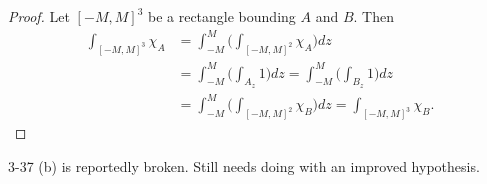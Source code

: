 \documentclass[20pt]{article}
\theoremstyle{plain}
\theoremstyle{definition}
\begin{document}
\begin{proof}
  Let $[-M, M]^3$ be a rectangle bounding $A$ and $B$. Then
  \begin{align*}
    \int_{[-M, M]^3}\chi_A
    &= \int_{-M}^M \bigg( \int_{[-M, M]^2} \chi_A \bigg)dz \\
    &= \int_{-M}^M \bigg( \int_{A_z} 1 \bigg) dz
    = \int_{-M}^M \bigg( \int_{B_z} 1 \bigg) dz \\
    &= \int_{-M}^M \bigg( \int_{[-M, M]^2} \chi_B \bigg)dz
    = \int_{[-M, M]^3}\chi_B.
  \end{align*}
\end{proof}


\color{Blue}
3-37 (b) is reportedly broken. Still needs doing with an improved hypothesis.
\color{Black}
\end{document}

